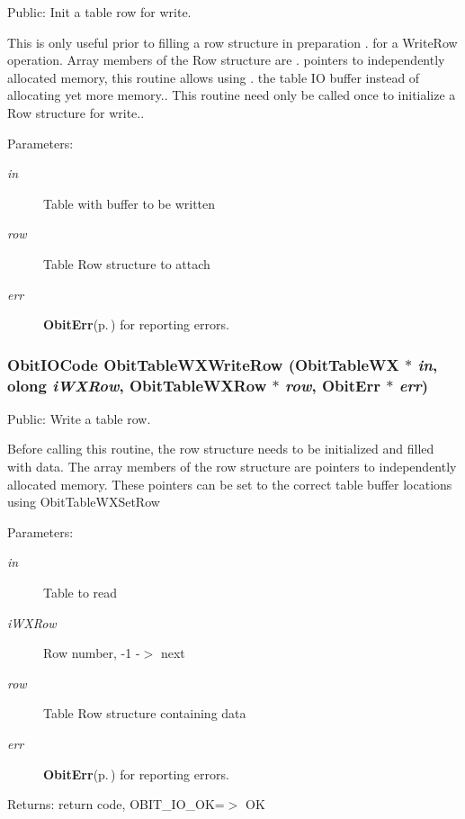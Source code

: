 Public: Init a table row for write. 

This is only useful prior to filling a row structure in preparation . for a Write\-Row operation. Array members of the Row structure are . pointers to independently allocated memory, this routine allows using . the table IO buffer instead of allocating yet more memory.. This routine need only be called once to initialize a Row structure for write.. \begin{Desc}
\item[Parameters:]
\begin{description}
\item[{\em in}]Table with buffer to be written \item[{\em row}]Table Row structure to attach \item[{\em err}]{\bf Obit\-Err}{\rm (p.\,\pageref{structObitErr})} for reporting errors. \end{description}
\end{Desc}
\subsubsection{\setlength{\rightskip}{0pt plus 5cm}Obit\-IOCode Obit\-Table\-WXWrite\-Row ({\bf Obit\-Table\-WX} $\ast$ {\em in}, {\bf olong} {\em i\-WXRow}, {\bf Obit\-Table\-WXRow} $\ast$ {\em row}, {\bf Obit\-Err} $\ast$ {\em err})}\label{ObitTableWX_8h_a20}


Public: Write a table row. 

Before calling this routine, the row structure needs to be initialized and filled with data. The array members of the row structure are pointers to independently allocated memory. These pointers can be set to the correct table buffer locations using Obit\-Table\-WXSet\-Row \begin{Desc}
\item[Parameters:]
\begin{description}
\item[{\em in}]Table to read \item[{\em i\-WXRow}]Row number, -1 -$>$ next \item[{\em row}]Table Row structure containing data \item[{\em err}]{\bf Obit\-Err}{\rm (p.\,\pageref{structObitErr})} for reporting errors. \end{description}
\end{Desc}
\begin{Desc}
\item[Returns:]return code, OBIT\_\-IO\_\-OK=$>$ OK \end{Desc}
